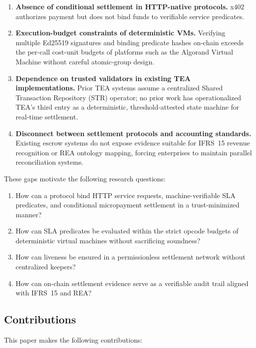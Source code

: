 \documentclass[journal]{IEEEtran}
\begin{document}
\begin{enumerate}[label=\textbf{G\arabic*.},leftmargin=*]
\item \textbf{Absence of conditional settlement in HTTP-native
protocols.}
x402 authorizes payment but does not bind funds to verifiable
service predicates.
\item \textbf{Execution-budget constraints of deterministic VMs.}
Verifying multiple Ed25519 signatures and binding predicate hashes
on-chain exceeds the per-call cost-unit budgets of platforms such
as the Algorand Virtual Machine without careful atomic-group design.
\item \textbf{Dependence on trusted validators in existing TEA
implementations.}
Prior TEA systems assume a centralized Shared Transaction Repository
(STR) operator; no prior work has operationalized TEA's third entry
as a deterministic, threshold-attested state machine for real-time
settlement.
\item \textbf{Disconnect between settlement protocols and accounting
standards.}
Existing escrow systems do not expose evidence suitable for IFRS~15
revenue recognition or REA ontology mapping, forcing enterprises to
maintain parallel reconciliation systems.
\end{enumerate}

\noindent These gaps motivate the following research questions:

\begin{enumerate}[label=\textbf{RQ\arabic*.},leftmargin=*]
\item How can a protocol bind HTTP service requests,
machine-verifiable SLA predicates, and conditional micropayment
settlement in a trust-minimized manner?
\item How can SLA predicates be evaluated within the strict opcode
budgets of deterministic virtual machines without sacrificing
soundness?
\item How can liveness be ensured in a permissionless settlement
network without centralized keepers?
\item How can on-chain settlement evidence serve as a verifiable
audit trail aligned with IFRS~15 and REA?
\end{enumerate}

\subsection{Contributions}
This paper makes the following contributions:
\end{document}
